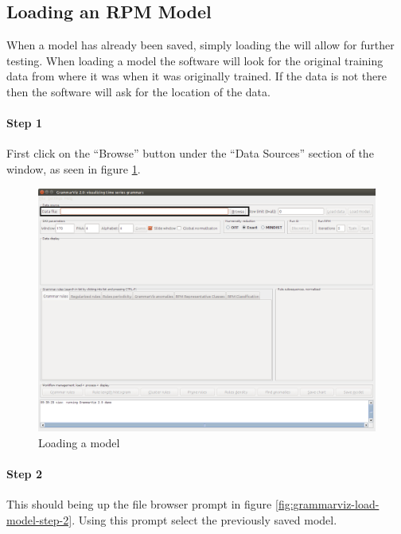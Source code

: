 \documentclass[letterpaper, 12pt]{article}
\begin{document}
\newpage
\subsection{Loading an RPM Model}
When a model has already been saved, simply loading the will allow for further testing. When loading a model the software will look for the original training data from where it was when it was originally trained. If the data is not there then the software will ask for the location of the data.

\paragraph{Step 1}
First click on the ``Browse'' button under the ``Data Sources'' section of the window, as seen in figure \ref{fig:grammarviz-load-model-step-1}. 

\begin{figure}[h]
  \includegraphics[width=\textwidth]{grammarviz-load-model-step-1}
  \caption{Loading a model}
  \label{fig:grammarviz-load-model-step-1}
\end{figure}

\newpage
\paragraph{Step 2}
This should being up the file browser prompt in figure \ref{fig:grammarviz-load-model-step-2}. Using this prompt select the previously saved model.
\end{document}
